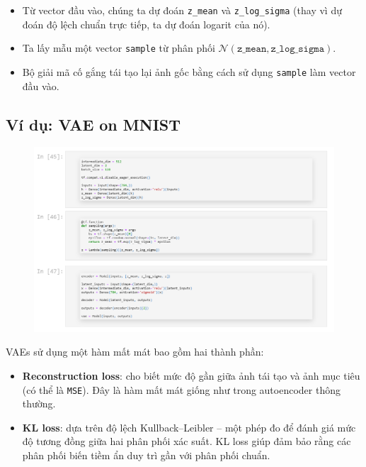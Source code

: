 \documentclass{book}
\begin{document}
\begin{itemize}
	\item Từ vector đầu vào, chúng ta dự đoán \texttt{z\_mean} và \texttt{z\_log\_sigma} (thay vì dự đoán độ lệch chuẩn trực tiếp, ta dự đoán logarit của nó).
	
	\item Ta lấy mẫu một vector \texttt{sample} từ phân phối \( \mathcal{N}(\texttt{z\_mean}, \texttt{z\_log\_sigma}) \).
	
	\item Bộ giải mã cố gắng tái tạo lại ảnh gốc bằng cách sử dụng \texttt{sample} làm vector đầu vào.
\end{itemize}
\subsection{Ví dụ: VAE on MNIST}
\begin{figure}[H]
	\centering
	\includegraphics[width=0.75\linewidth]{images/au21.png}
\end{figure}

VAEs sử dụng một hàm mất mát bao gồm hai thành phần:

\begin{itemize}
	\item \textbf{Reconstruction loss}: cho biết mức độ gần giữa ảnh tái tạo và ảnh mục tiêu (có thể là \texttt{MSE}). Đây là hàm mất mát giống như trong autoencoder thông thường.
	
	\item \textbf{KL loss}: dựa trên độ lệch Kullback–Leibler – một phép đo để đánh giá mức độ tương đồng giữa hai phân phối xác suất. KL loss giúp đảm bảo rằng các phân phối biến tiềm ẩn duy trì gần với phân phối chuẩn.
\end{itemize}
\end{document}
